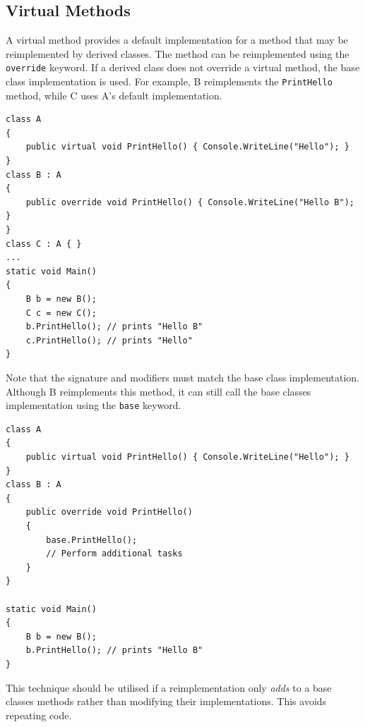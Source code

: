 \documentclass{article}
\begin{document}
\subsection{Virtual Methods}
A virtual method provides a default implementation for a method that
may be reimplemented by derived classes. The method can be
reimplemented using the \texttt{override} keyword. If a
derived class does not override a virtual method, the base class
implementation is used. For example, B reimplements the
\texttt{PrintHello} method, while C uses A's default
implementation.
\begin{verbatim}
class A
{
    public virtual void PrintHello() { Console.WriteLine("Hello"); }
}
class B : A
{
    public override void PrintHello() { Console.WriteLine("Hello B"); }
}
class C : A { }
...
static void Main()
{
    B b = new B();
    C c = new C();
    b.PrintHello(); // prints "Hello B"
    c.PrintHello(); // prints "Hello"
}
\end{verbatim}
Note that the signature and modifiers must match the base class
implementation. Although B reimplements this method, it can still call
the base classes implementation using the \texttt{base}
keyword.
\begin{verbatim}
class A
{
    public virtual void PrintHello() { Console.WriteLine("Hello"); }
}
class B : A
{
    public override void PrintHello()
    {
        base.PrintHello();
        // Perform additional tasks
    }
}

static void Main()
{
    B b = new B();
    b.PrintHello(); // prints "Hello B"
}
\end{verbatim}
This technique should be utilised if a reimplementation only
\textit{adds} to a base classes methods rather than modifying their
implementations. This avoids repeating code.
\end{document}
